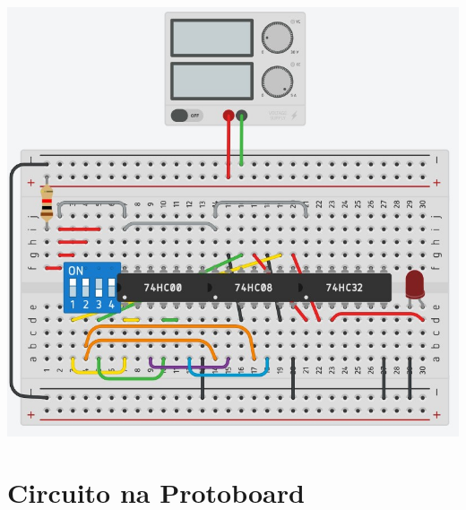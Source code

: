 \documentclass[]{article}
\begin{document}
		\includegraphics[scale=0.6]{Images/Tinkercad 06.jpg} \\
	\section{Circuito na Protoboard}
	
\end{document}
